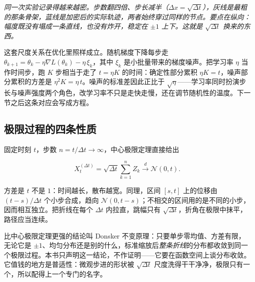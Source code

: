 \begin{center}

\emph{同一次实验记录得越来越密。步数翻四倍、步长减半（\(\Delta x=\sqrt{\Delta t}\)），灰线是最粗的那条骨架，蓝线是加密后的实际轨迹，两者始终穿过同样的节点。要点在纵向：幅度既没有塌成一条直线，也没有炸开，稳定在 \(\pm1\) 上下。这就是 \(\sqrt{\Delta t}\) 换来的东西。}
\end{center}

这套尺度关系在优化里照样成立。随机梯度下降每步走 \(\theta_{k+1}=\theta_k-\eta\nabla L(\theta_k)-\eta\,\xi_k\)，其中 \(\xi_k\) 是小批量带来的梯度噪声。把学习率 \(\eta\) 当作时间步，跑 \(K\) 步相当于走了 \(t=\eta K\) 的时间：确定性部分累积 \(\eta K=t\)，噪声部分累积的方差是 \(\eta^2K=\eta\,t\)。噪声的标准差因此正比于 \(\sqrt{\eta}\)——学习率同时扮演步长与噪声强度两个角色，改学习率不只是走快走慢，还在调节随机性的温度。下一节之后这条对应会写成方程。

\subsection{极限过程的四条性质}

固定时刻 \(t\)，步数 \(n=t/\Delta t\to\infty\)，中心极限定理直接给出

\[
X^{(\Delta t)}_t=\sqrt{\Delta t}\sum_{k=1}^{n}Z_k
\xrightarrow{\;d\;}\mathcal N(0,t).
\]

方差是 \(t\) 不是 \(1\)：时间越长，散布越宽。同理，区间 \([s,t]\) 上的位移由 \((t-s)/\Delta t\) 个小步合成，趋向 \(\mathcal N(0,t-s)\)；不相交的区间用的是不同的小步，因而相互独立。把折线在每个 \(\Delta t\) 内拉直，跳幅只有 \(\sqrt{\Delta t}\)，折角在极限中抹平，路径应当连续。

比中心极限定理更强的结论叫 Donsker 不变原理：只要单步零均值、方差有限，无论它是 \(\pm1\)、均匀分布还是别的什么，标准缩放后\emph{整条折线}的分布都收敛到同一个极限过程。本书只声明这一结论，不作证明——它要在函数空间上谈分布收敛。它值钱的地方是普适性：微观步进的形状被 \(\sqrt{\Delta t}\) 尺度洗得干干净净，极限只有一个，所以配得上一个专门的名字。

